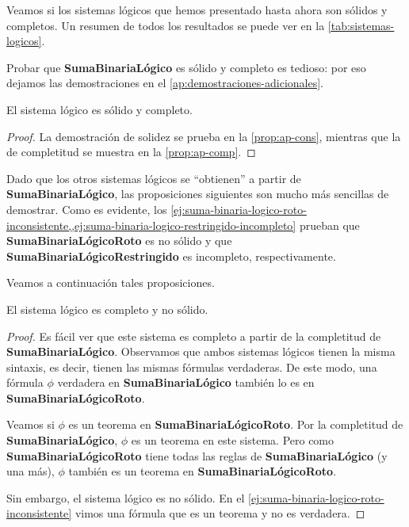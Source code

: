 Veamos si los sistemas lógicos que hemos presentado hasta ahora son sólidos y completos. Un resumen de todos los resultados se puede ver en la \cref{tab:sistemas-logicos}.

Probar que \textbf{SumaBinariaLógico} es sólido y completo es tedioso: por eso dejamos las demostraciones en el \cref{ap:demostraciones-adicionales}.


\begin{proposicion}
El sistema lógico  es sólido y completo.
\end{proposicion}
\begin{proof}
La demostración de solidez se prueba en la \cref{prop:ap-cons}, mientras que la de completitud se muestra en la \cref{prop:ap-comp}.
\end{proof}

Dado que los otros sistemas lógicos se ``obtienen'' a partir de \textbf{SumaBinariaLógico}, las proposiciones siguientes son mucho más sencillas de demostrar. Como es evidente, los \cref{ej:suma-binaria-logico-roto-inconsistente,,ej:suma-binaria-logico-restringido-incompleto} prueban que \textbf{SumaBinariaLógicoRoto} es no sólido y que \textbf{SumaBinariaLógicoRestringido} es incompleto, respectivamente.

Veamos a continuación tales proposiciones.

\begin{proposicion}
El sistema lógico  es completo y no sólido.
\end{proposicion}
\begin{proof}
Es fácil ver que este sistema es completo a partir de la completitud de \textbf{SumaBinariaLógico}. Observamos que ambos sistemas lógicos tienen la misma sintaxis, es decir, tienen las mismas fórmulas verdaderas. De este modo, una fórmula $\phi$ verdadera en \textbf{SumaBinariaLógico} también lo es en \textbf{SumaBinariaLógicoRoto}.

Veamos si $\phi$ es un teorema en \textbf{SumaBinariaLógicoRoto}. Por la completitud de \textbf{SumaBinariaLógico}, $\phi$ es un teorema en este sistema. Pero como \textbf{SumaBinariaLógicoRoto} tiene todas las reglas de \textbf{SumaBinariaLógico} (y una más), $\phi$ también es un teorema en \textbf{SumaBinariaLógicoRoto}.

Sin embargo, el sistema lógico es no sólido. En el \cref{ej:suma-binaria-logico-roto-inconsistente} vimos una fórmula que es un teorema y no es verdadera.
\end{proof}

